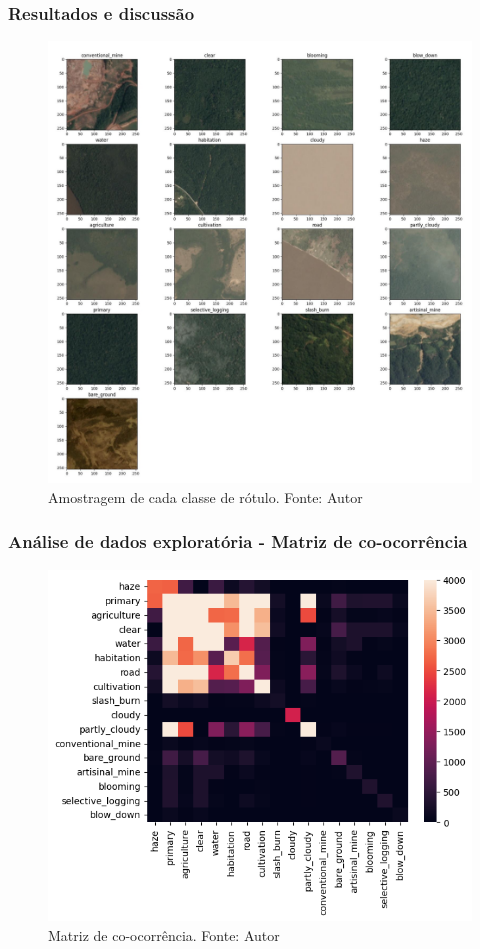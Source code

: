 \documentclass{beamer}
\begin{document}
\begin{frame}
\frametitle{Resultados e discussão}

    \begin{figure}[!ht]
        \centering
        \includegraphics[width=\columnwidth]{Imagens/results/EDA/Class Sampling.jpg}
        \caption{Amostragem de cada classe de rótulo.
        Fonte: Autor}
       \label{fig:classes}
    \end{figure}
        
\end{frame}
    

\begin{frame}
    \frametitle{Análise de dados exploratória - Matriz de co-ocorrência}
    \begin{figure}[!ht]
        \centering
        \includegraphics[width=0.8\columnwidth]{Imagens/results/EDA/matriz de coocorrencia.png}
        \caption{Matriz de co-ocorrência.
        Fonte: Autor}
       \label{fig:coocorrencia}
    \end{figure}    
\end{frame}
\end{document}
